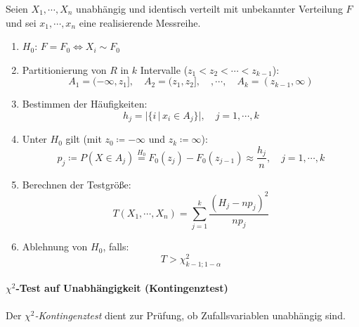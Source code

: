 \documentclass[a4paper, 11pt, accentcolor = tud3b]{tudreport}
\newcommand{\forwhich}{\ensuremath{{\,\vert\,}}}
\begin{document}
	            Seien \( X_1, \cdots, X_n \) unabhängig und identisch verteilt mit unbekannter Verteilung \(F\) und sei \(x_1, \cdots, x_n\) eine realisierende Messreihe.
                \begin{enumerate}
                	\item \(H_0\): \quad \( F = F_0 \iff X_i \sim F_0 \)
                	\item Partitionierung von \(R\) in \(k\) Intervalle (\( z_1 < z_2 < \cdots < z_{k-1} \)):
	                	\begin{equation*}
		                	A_1 = (-\infty, z_1], \quad A_2 = (z_1, z_2], \quad, \cdots, \quad A_k = (z_{k-1}, \infty)
	                	\end{equation*}
	                \item Bestimmen der Häufigkeiten:
		                \begin{equation*}
			                h_j = \big| \{ i \forwhich x_i \in A_j \} \big|, \quad j = 1, \cdots, k
		                \end{equation*}
		            \item Unter \( H_0 \) gilt (mit \( z_0 \coloneqq -\infty \) und \( z_k \coloneqq \infty \)):
			            \begin{equation*}
				            p_j \coloneqq P(X \in A_j) \overset{H_0}{=} F_0(z_j) - F_0(z_{j-1}) \approx \frac{h_j}{n}, \quad j = 1, \cdots, k
			            \end{equation*}
			        \item Berechnen der Testgröße:
				        \begin{equation*}
					        T(X_1, \cdots, X_n) = \sum_{j = 1}^{k} \frac{(H_j - n p_j)^2}{n p_j}
				        \end{equation*}
				    \item Ablehnung von \(H_0\), falls:
					    \begin{equation*}
						    T > \chi_{k - 1; 1 - \alpha}^2
					    \end{equation*}
                \end{enumerate}

            \paragraph{\(\chi^2\)-Test auf Unabhängigkeit (Kontingenztest)}
                Der \textit{\(\chi^2\)-Kontingenztest} dient zur Prüfung, ob Zufallsvariablen unabhängig sind.
                
\end{document}
